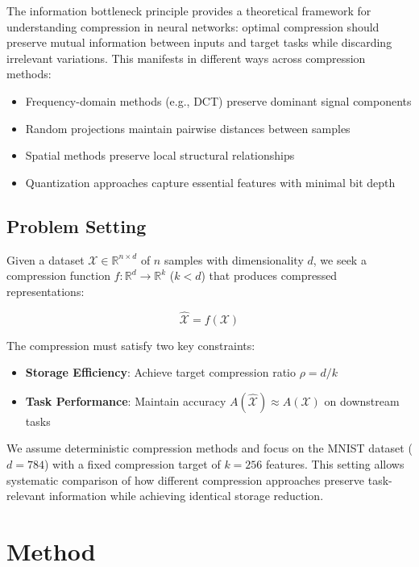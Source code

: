 \documentclass{article} %
\begin{document}
The information bottleneck principle \citep{Hu2024ASO} provides a theoretical framework for understanding compression in neural networks: optimal compression should preserve mutual information between inputs and target tasks while discarding irrelevant variations. This manifests in different ways across compression methods:

\begin{itemize}
    \item Frequency-domain methods (e.g., DCT) preserve dominant signal components
    \item Random projections maintain pairwise distances between samples
    \item Spatial methods preserve local structural relationships
    \item Quantization approaches capture essential features with minimal bit depth
\end{itemize}

\subsection{Problem Setting}
Given a dataset $\mathcal{X} \in \mathbb{R}^{n \times d}$ of $n$ samples with dimensionality $d$, we seek a compression function $f: \mathbb{R}^d \rightarrow \mathbb{R}^k$ ($k < d$) that produces compressed representations:

\begin{equation}
    \hat{\mathcal{X}} = f(\mathcal{X})
\end{equation}

The compression must satisfy two key constraints:
\begin{itemize}
    \item \textbf{Storage Efficiency}: Achieve target compression ratio $\rho = d/k$
    \item \textbf{Task Performance}: Maintain accuracy $A(\hat{\mathcal{X}}) \approx A(\mathcal{X})$ on downstream tasks
\end{itemize}

We assume deterministic compression methods and focus on the MNIST dataset ($d=784$) with a fixed compression target of $k=256$ features. This setting allows systematic comparison of how different compression approaches preserve task-relevant information while achieving identical storage reduction.

\section{Method}
\label{sec:method}
\end{document}
